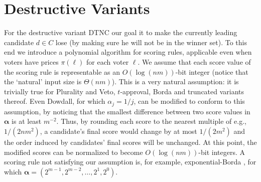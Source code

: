\documentclass[letterpaper]{article} %
\newcommand{\vecgreek}{\bm}
\newcommand{\veca}{\vecgreek{\alpha}}
\newcommand{\SC}{\textsc{Set Cover}}
\newcommand{\DTNC}{\textsc{DTNC}}
\newcommand{\diff}{\mathrm{diff}}
\newcommand{\NP}{\mathrm{NP}}
\newcommand{\Pclass}{\mathrm{P}}
\begin{document}

\section{Destructive Variants}
For the destructive variant \DTNC{} our goal it to make the currently leading candidate $d \in C$ lose (by making sure he will not be in the winner set). To this end we introduce a polynomial algorithm for scoring rules, applicable even when voters have prices $\pi(\ell)$ for each voter $\ell$. We assume that  each score value of the scoring rule is representable as an $O(\log{(nm)})$-bit integer (notice that the `natural' input size is $\Theta(nm)$). This is a very natural assumption: it is trivially true for Plurality and Veto, $t$-approval, Borda and truncated variants thereof. Even Dowdall, for which $\alpha_j = 1/j$, can be modified to conform to this assumption, by noticing that the smallest difference between two score values in $\veca$ is at least $m^{-2}$. Thus, by rounding each score to the nearest multiple of e.g., $1/(2nm^2)$, a candidate's final score would change by at most $1/(2m^2)$ and the order induced by candidates' final scores will be unchanged. At this point, the modified scores can be normalized to become $O(\log{(nm)})$-bit integers. A scoring rule not satisfying our assumption is, for example, exponential-Borda \cite{DBLP:journals/tcci/PutF16}, for which $\veca=(2^{m-1},2^{m-2},\ldots,2^1,2^0)$. 

\end{document}
